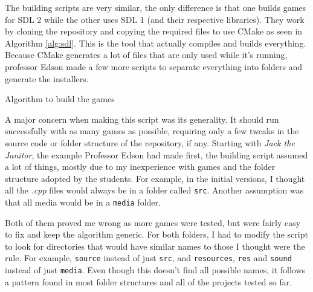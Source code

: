 The building scripts are very similar, the only difference is that one builds games for SDL 2 while the other uses SDL 1 (and their respective libraries). They work by cloning the repository and copying the required files to use CMake as seen in Algorithm \ref{alg:sdl}. This is the tool that actually compiles and builds everything. Because CMake generates a lot of files that are only used while it's running, professor Edson made a few more scripts to separate everything into folders and generate the installers.

\begin{algorithm}[h!]
\caption{Algorithm to build the games}
\label{alg:sdl}
\begin{algorithmic}
\Start
{}  
\State {} 
 
 
\State {} 
\State {} 
\State {} 
\State {} 
\End
\end{algorithmic}
\end{algorithm}

A major concern when making this script was its generality. It should run successfully with as many games as possible, requiring only a few tweaks in the source code or folder structure of the repository, if any. Starting with \textit{Jack the Janitor}, the example Professor Edson had made first, the  building script assumed a lot of things, mostly due to my inexperience with games and the folder structure adopted by the students. For example, in the initial versions, I thought all the \textit{.cpp} files would always be in a folder called \texttt{src}. Another assumption was that all media would be in a \texttt{media} folder.

Both of them proved me wrong as more games were tested, but were fairly easy to fix and keep the algorithm generic. For both folders, I had to modify the script to look for directories that would have similar names to those I thought were the rule. For example, \texttt{source} instead of just \texttt{src}, and \texttt{resources}, \texttt{res} and \texttt{sound} instead of just \texttt{media}. Even though this doesn't find all possible names, it follows a pattern found in most folder structures and all of the projects tested so far.

